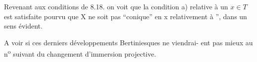 Revenant aux conditions de 8.18. on voit que la condition a)
relative à un $x \in T$ est satisfaite pourvu que X ne soit pas ``conique''
en x relativement à '', dans un sens évident.

 A voir si ces derniers développements Bertiniesques ne viendrai-%
ent pas mieux au n\textsuperscript{o} suivant du changement d'immersion projective. 
